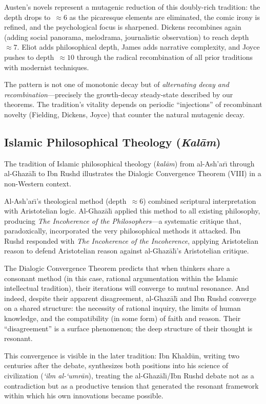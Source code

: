 \documentclass[11pt,openany]{book}
\theoremstyle{definition}
\theoremstyle{plain}
\theoremstyle{remark}
\begin{document}
Austen's novels represent a mutagenic reduction of this doubly-rich tradition: the depth drops to~$\approx 6$ as the picaresque elements are eliminated, the comic irony is refined, and the psychological focus is sharpened. Dickens recombines again (adding social panorama, melodrama, journalistic observation) to reach depth~$\approx 7$. Eliot adds philosophical depth, James adds narrative complexity, and Joyce pushes to depth~$\approx 10$ through the radical recombination of all prior traditions with modernist techniques.

The pattern is not one of monotonic decay but of \emph{alternating decay and recombination}---precisely the growth-decay steady-state described by our theorems. The tradition's vitality depends on periodic ``injections'' of recombinant novelty (Fielding, Dickens, Joyce) that counter the natural mutagenic decay.

\subsection{Islamic Philosophical Theology (\emph{Kal\=am})}

The tradition of Islamic philosophical theology (\emph{kal\=am}) from al-Ash'ar\=\i{} through al-Ghaz\=al\=\i{} to Ibn Rushd illustrates the Dialogic Convergence Theorem (VIII) in a non-Western context.

Al-Ash'ar\=\i{}'s theological method (depth~$\approx 6$) combined scriptural interpretation with Aristotelian logic. Al-Ghaz\=al\=\i{} applied this method to all existing philosophy, producing \emph{The Incoherence of the Philosophers}---a systematic critique that, paradoxically, incorporated the very philosophical methods it attacked. Ibn Rushd responded with \emph{The Incoherence of the Incoherence}, applying Aristotelian reason to defend Aristotelian reason against al-Ghaz\=al\=\i{}'s Aristotelian critique.

The Dialogic Convergence Theorem predicts that when thinkers share a consonant method (in this case, rational argumentation within the Islamic intellectual tradition), their iterations will converge to mutual resonance. And indeed, despite their apparent disagreement, al-Ghaz\=al\=\i{} and Ibn Rushd converge on a shared structure: the necessity of rational inquiry, the limits of human knowledge, and the compatibility (in some form) of faith and reason. Their ``disagreement'' is a surface phenomenon; the deep structure of their thought is resonant.

This convergence is visible in the later tradition: Ibn Khald\=un, writing two centuries after the debate, synthesizes both positions into his science of civilization (\emph{`ilm al-`umr\=an}), treating the al-Ghaz\=al\=\i{}/Ibn Rushd debate not as a contradiction but as a productive tension that generated the resonant framework within which his own innovations became possible.
\end{document}

